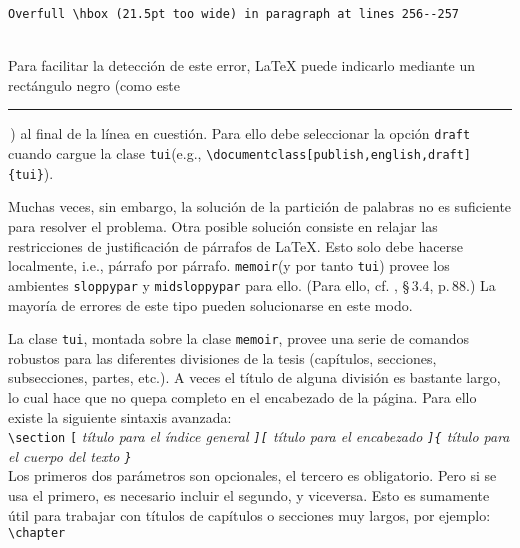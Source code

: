 \documentclass[11pt,
              article,
              oneside
              ]{memoir}
\newcommand*{\comando}[1]{\texttt{#1}}
\newcommand*{\paquete}[1]{\texttt{\color{NavyBlue}#1}\xspace}
\newcommand*{\tui}{{\normalfont\paquete{tui}}\xspace}
\newcommand*{\MEMOIR}{\paquete{memoir}}
\begin{document}
\begin{compactenum}
\begin{small}
\begin{verbatim}
Overfull \hbox (21.5pt too wide) in paragraph at lines 256--257
\end{verbatim}
\end{small}~\\[-6pt]
%
Para facilitar la detección de este error, \LaTeX{} puede indicarlo mediante un rectángulo negro (como este \rule[-3pt]{4mm}{4mm}\,) al final de la línea en cuestión. Para ello debe seleccionar la opción \comando{draft} cuando cargue la clase \tui (e.g., \verb+\documentclass[publish,english,draft]{tui}+).
	\item Muchas veces, sin embargo, la solución de la partición de palabras no es suficiente para resolver el problema. Otra posible solución consiste en relajar las restricciones de justificación de párrafos de \LaTeX. Esto solo debe hacerse localmente, i.e., párrafo por párrafo. \MEMOIR (y por tanto \tui) provee los ambientes \comando{sloppypar} y \comando{midsloppypar} para ello. (Para ello, cf. \cite{MEMOIR}, \S\,3.4, p.\,88.) La mayoría de errores de este tipo pueden solucionarse en este modo.
  \item La clase \tui, montada sobre la clase \MEMOIR, provee una serie de comandos robustos para las diferentes divisiones de la tesis (capítulos, secciones, subsecciones, partes, etc.). A veces el título de alguna división es bastante largo, lo cual hace que no quepa completo en el encabezado de la página. Para ello existe la siguiente sintaxis avanzada:\\[6pt]
      {\small%
      \verb+\section+%
        \verb+[+%
        \itshape{título para el índice general}%
        \verb+][+%
        \itshape{título para el encabezado}%
        \verb+]{+%
        \itshape{título para el cuerpo del texto}%
        \verb+}+%
       }
       \ \\[6pt]
       \noindent Los primeros dos parámetros son opcionales, el tercero es obligatorio. Pero si se usa el primero, es necesario incluir el segundo, y viceversa. Esto es sumamente útil para trabajar con títulos de capítulos o secciones muy largos, por ejemplo:\\[6pt]
       {\small%
       \verb+\chapter+%
}
\end{compactenum}
\end{document}
